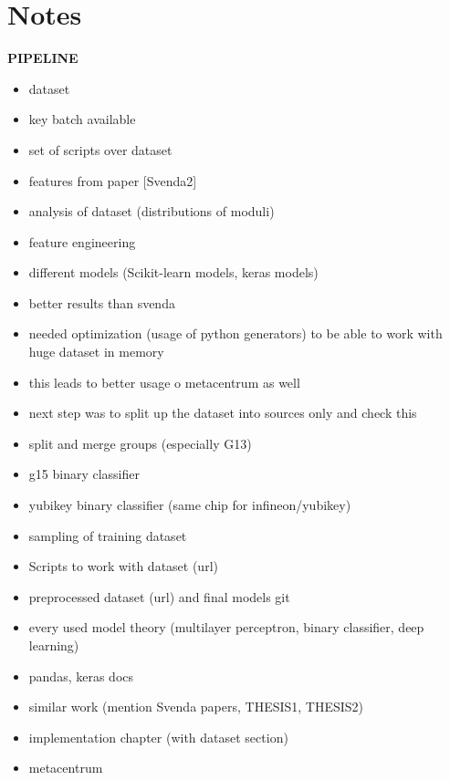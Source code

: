\chapter{Notes}

\textbf{PIPELINE}
\begin{itemize}

\item dataset
\item key batch available
\item set of scripts over dataset
\item features from paper [Svenda2]
\item analysis of dataset (distributions of moduli)
\item feature engineering
\item different models (Scikit-learn models, keras models)
\item better results than svenda
\item needed optimization (usage of python generators) to be able to work with huge dataset in memory
\item this leads to better usage o metacentrum as well
\item next step was to split up the dataset into sources only and check this
\item split and merge groups (especially G13)
\item g15 binary classifier
\item yubikey binary classifier (same chip for infineon/yubikey)
\item sampling of training dataset 
\item Scripts to work with dataset (url)
\item preprocessed dataset (url) and final models git
\item every used model theory (multilayer perceptron, binary classifier, deep learning)
\item pandas, keras docs
\item similar work (mention Svenda papers, THESIS1, THESIS2)

\item implementation chapter (with dataset section)
\item metacentrum


\end{itemize}